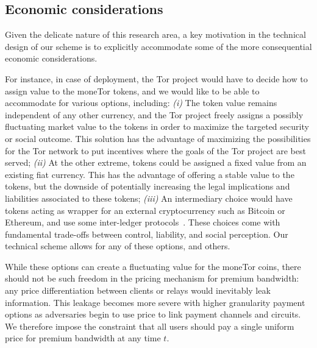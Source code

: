 
\subsection{Economic considerations}



Given the delicate nature of this research area, a key motivation in
the technical design of our scheme is to explicitly accommodate some
of the more consequential economic considerations.

For instance, in case of deployment, the Tor project would have to
decide how to assign value to the moneTor tokens, and we would like to
be able to accommodate for various options, including: \emph{(i)} The
token value remains independent of any other currency, and the Tor
project freely assigns a possibly fluctuating market value to the
tokens in order to maximize the targeted security or social
outcome. This solution has the advantage of maximizing the
possibilities for the Tor network to put incentives where the goals of
the Tor project are best served; \emph{(ii)} At the other extreme,
tokens could be assigned a fixed value from an existing fiat currency.
This has the advantage of offering a stable value to the tokens, but
the downside of potentially increasing the legal implications and
liabilities associated to these tokens; \emph{(iii)} An intermediary
choice would have tokens acting as wrapper for an external
cryptocurrency such as Bitcoin or Ethereum, and use some inter-ledger
protocols~\cite{back2014enabling,poon2017plasma}. These choices
come with fundamental trade-offs between control, liability, and
social perception. Our technical scheme allows for any of these
options, and others.

While these options can create a fluctuating value for the
moneTor coins, there should not be such freedom in the pricing
mechanism for premium bandwidth: any price differentiation between
clients or relays would inevitably leak information. This leakage
becomes more severe with higher granularity payment options as
adversaries begin to use price to link payment channels and circuits.
We therefore impose the constraint that all users should pay a single
uniform price for premium bandwidth at any time $t$.

